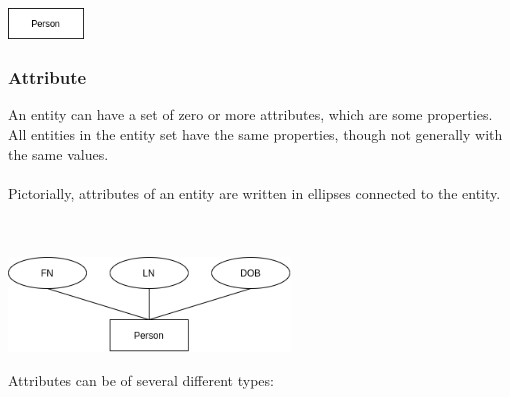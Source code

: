 \documentclass{article}
\begin{document}
\centerline{\includegraphics[width=2cm]{./assets/entity.png}}
	
\subsubsection{Attribute}
An entity can have a set of zero or more attributes, which are some properties. All entities in the entity set have the same properties, though not generally with the same values. \\ \\
Pictorially, attributes of an entity are written in ellipses connected to the entity. \\ \\ \\

\centerline{\includegraphics[width=7.5cm]{./assets/attribute.png}}
\vspace{.6cm}
\noindent Attributes can be of several different types:
\end{document}
